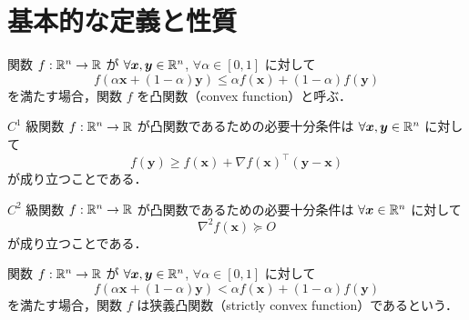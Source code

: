 \chapter{基本的な定義と性質}

\begin{definition}
    関数 $f : \mathbb{R}^n \to \mathbb{R}$ が
    $\forall \bm{x}, \bm{y} \in \mathbb{R}^n$, $\forall \alpha \in [0, 1]$ に対して
    \begin{equation}
        f\left(\alpha \bm{x} + (1-\alpha) \bm{y}\right)
        \le \alpha f(\bm{x}) + (1-\alpha) f(\bm{y})
    \end{equation}
    を満たす場合，関数 $f$ を凸関数（convex function）と呼ぶ．
\end{definition}

\begin{theorem}
    $C^1$ 級関数 $f : \mathbb{R}^n \to \mathbb{R}$ が凸関数であるための必要十分条件は
    $\forall \bm{x}, \bm{y} \in \mathbb{R}^n$ に対して
    \begin{equation}
        f(\bm{y}) \ge f(\bm{x}) + \nabla f(\bm{x})^\top (\bm{y} - \bm{x})
    \end{equation}
    が成り立つことである．
\end{theorem}

\begin{theorem}
    $C^2$ 級関数 $f : \mathbb{R}^n \to \mathbb{R}$ が凸関数であるための必要十分条件は
    $\forall \bm{x} \in \mathbb{R}^n$ に対して
    \begin{equation}
        \nabla^2 f(\bm{x}) \succeq O
    \end{equation}
    が成り立つことである．
\end{theorem}

\begin{definition}
    関数 $f : \mathbb{R}^n \to \mathbb{R}$ が
    $\forall \bm{x}, \bm{y} \in \mathbb{R}^n$, $\forall \alpha \in [0, 1]$ に対して
    \begin{equation}
        f\left(\alpha \bm{x} + (1-\alpha) \bm{y}\right)
        < \alpha f(\bm{x}) + (1-\alpha) f(\bm{y})
    \end{equation}
    を満たす場合，関数 $f$ は狭義凸関数（strictly convex function）であるという．
\end{definition}

